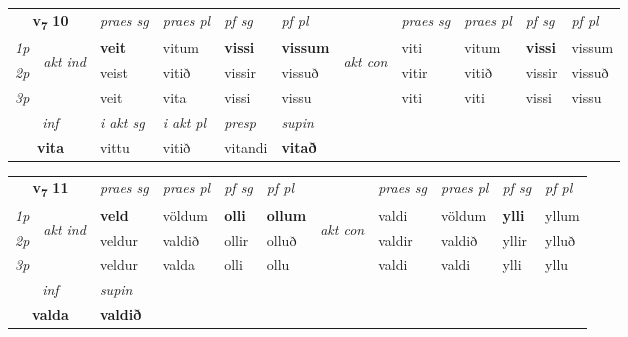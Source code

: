 \noindent
\begin{tabular}{lllllllllll} \toprule
\multicolumn{2}{c}{\textbf{v{\textsubscript{7}}} \Large{\textbf{10}}}  &  \textit{praes sg}  & \textit{praes pl}  &\textit{ pf sg} & \textit{pf pl} &  &  \textit{praes sg}  & \textit{praes pl}  & \textit{pf sg} & \textit{pf pl } \\*
	\cmidrule{3-6} \cmidrule{8-11}
 {\textit{1p}} & \multirow{3}{*}{\begin{turn}{90}\textit{akt ind}\end{turn}} & \textbf{veit} & vitum & \textbf{vissi} & \textbf{vissum} & \multirow{3}{*}{\begin{turn}{90}\textit{akt con}\end{turn}} &viti & vitum & \textbf{vissi} & vissum\\*
 {\textit{2p}} &  &  veist  & vitið & vissir & vissuð & & vitir & vitið & vissir & vissuð \\*
{\textit{3p}} &  & veit & vita & vissi & vissu & & viti & viti& vissi & vissu \\*
\cmidrule{3-6} \cmidrule{8-11}

   \multicolumn{2}{c}{\textit{inf}}  & \textit{i akt sg} & \textit{i akt pl}   & \textit{presp} & \textit{supin}   \\*
  \multicolumn{2}{c}{\textbf{vita}} & vittu  & vitið   & vitandi &  \textbf{vitað}   \\*
\end{tabular}

\noindent
\begin{tabular}{lllllllllll} \toprule
\multicolumn{2}{c}{\textbf{v{\textsubscript{7}}} \Large{\textbf{11}}}  &  \textit{praes sg}  & \textit{praes pl}  &\textit{ pf sg} & \textit{pf pl} &  &  \textit{praes sg}  & \textit{praes pl}  & \textit{pf sg} & \textit{pf pl } \\*
	\cmidrule{3-6} \cmidrule{8-11}
 {\textit{1p}} & \multirow{3}{*}{\begin{turn}{90}\textit{akt ind}\end{turn}} & \textbf{veld} & völdum & \textbf{olli} & \textbf{ollum} & \multirow{3}{*}{\begin{turn}{90}\textit{akt con}\end{turn}} &valdi & völdum & \textbf{ylli} & yllum\\*
 {\textit{2p}} &  &  veldur  & valdið & ollir & olluð & & valdir & valdið & yllir & ylluð \\*
{\textit{3p}} &  & veldur & valda & olli & ollu & & valdi & valdi& ylli & yllu \\*
\cmidrule{3-6} \cmidrule{8-11}

   \multicolumn{2}{c}{\textit{inf}}      & \textit{supin}   \\*
  \multicolumn{2}{c}{\textbf{valda}}       &  \textbf{valdið}   \\*
\end{tabular}

